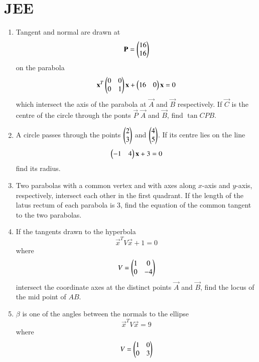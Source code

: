 \documentclass[journal,12pt,twocolumn]{IEEEtran}
\renewcommand\thesection{\arabic{section}}
\begin{document}
\section{JEE}
\begin{enumerate}[label=\thesection.\arabic*
,ref=\thesection.\theenumi]
\item Tangent and normal are drawn at 
\begin{equation}
\mathbf{P}= \begin{pmatrix}16 \\ 16\end{pmatrix}
\end{equation}
on the parabola 
\begin{equation}
\mathbf{x}^T\begin{pmatrix}0 & 0 \\ 0 & 1\end{pmatrix}\mathbf{x} + \begin{pmatrix}16 & 0\end{pmatrix}\mathbf{x} =0
\end{equation}
%
which intersect the axis of the parabola at $\vec{A}$ and $\vec{B}$ respectively.  If $\vec{C}$ is the centre 
of the circle through the ponts $\vec{P}$ $\vec{A}$ and $\vec{B}$, find $\tan  CPB$.
\item A circle passes through the points $\begin{pmatrix}2 \\ 3\end{pmatrix}$ and $\begin{pmatrix}4 \\  5\end{pmatrix}$.  If its centre lies on the 
line
\begin{equation}
\begin{pmatrix}-1 & 4\end{pmatrix}\mathbf{x} + 3 =0
\end{equation}
%
find its radius.
%
\item Two parabolas with a common vertex and with axes along $x$-axis and $y$-axis, respectively, intersect 
each other in the first quadrant.  If the length of the latus rectum of each parabola is 3, find the equation 
of the common tangent to the two parabolas.
%
\item If the tangents drawn to the hyperbola 
\begin{equation}
\vec{x}^TV\vec{x} +1=0
\end{equation}
%
where
\begin{equation}
V = \begin{pmatrix}1 & 0 \\ 0 & -4\end{pmatrix}
\end{equation}
%
intersect the coordinate axes at the distinct points $\vec{A}$ and $\vec{B}$, find the locus of the mid point 
of $AB$.
\item $\beta$ is one of the angles between the normals to the ellipse
\begin{equation}
\vec{x}^TV\vec{x} =9
\end{equation}
%
where
\begin{equation}
V = \begin{pmatrix}1 & 0 \\ 0 & 3\end{pmatrix}
\end{equation}

\end{enumerate}
\end{document}
